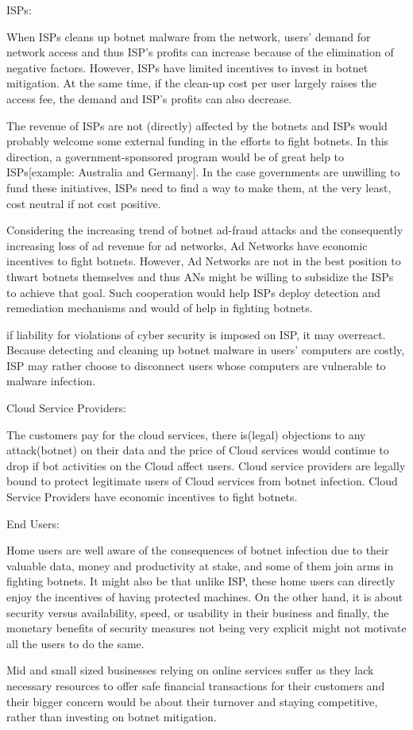 ISPs:

When ISPs cleans up botnet malware from the network, users’ demand for network access and thus ISP’s profits can increase because of the elimination of negative factors. However, ISPs have limited incentives to invest in botnet mitigation. At the same time, if the clean-up cost per user largely raises the access fee, the demand and ISP’s profits can also decrease. 

The revenue of ISPs are not (directly) affected by the botnets and ISPs would probably welcome some external funding in the efforts to fight botnets. In this direction, a government-sponsored program would be of great help to ISPs[example: Australia and Germany]. In the case governments are unwilling to fund these initiatives, ISPs need to find a way to make them, at the very least, cost neutral if not cost positive. 

Considering the increasing trend of botnet ad-fraud attacks and the consequently increasing loss of ad revenue for ad networks, Ad Networks have economic incentives to fight botnets. However, Ad Networks are not in the best position to thwart botnets themselves and thus ANs might be willing to subsidize the ISPs to achieve that goal. Such cooperation would help ISPs deploy detection and remediation mechanisms and would of help in fighting botnets. 

if liability for violations of cyber security is imposed on ISP, it may overreact. Because detecting and cleaning up botnet malware in users’ computers are costly, ISP may rather choose to disconnect users whose computers are vulnerable to malware infection.

Cloud Service Providers:

The customers pay for the cloud services, there is(legal) objections to any attack(botnet) on their data and the price of Cloud services would continue to drop if bot activities on the Cloud affect users. Cloud service providers are legally  bound to protect legitimate users of Cloud services from botnet infection. Cloud Service Providers have economic incentives to fight botnets.

End Users:

Home users are well aware of the consequences of botnet infection due to their valuable data, money and productivity at stake, and some of them join arms in fighting botnets. It might also be that unlike ISP, these home users can directly enjoy the incentives of having protected machines. On the other hand, it is about security versus availability, speed, or usability in their business and finally, the monetary benefits of security measures not being very explicit might not motivate all the users to do the same.

Mid and small sized businesses relying on online services suffer as they lack necessary resources to offer safe financial transactions for their customers and their bigger concern would be about their turnover and staying competitive, rather than investing on botnet mitigation.

